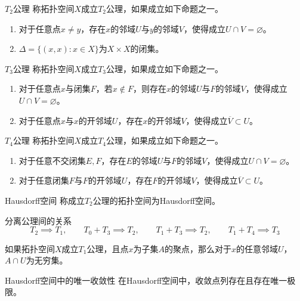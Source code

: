 \documentclass[lang = cn, scheme = chinese, thmcnt = section, usesamecnt]{elegantbook}
\newcommand{\sub}{\subset}             %
\begin{document}
\begin{definition}{$T_2$公理}
	称拓扑空间$X$成立$T_2$公理，如果成立如下命题之一。
	\begin{enumerate}
		\item 对于任意点$x\ne y$，存在$x$的邻域$U$与$y$的邻域$V$，使得成立$U\cap V=\varnothing$。
		\item $\Delta=\{ (x,x):x\in X \}$为$X\times X$的闭集。
	\end{enumerate}
\end{definition}

\begin{definition}{$T_3$公理}
	称拓扑空间$X$成立$T_3$公理，如果成立如下命题之一。
	\begin{enumerate}
		\item 对于任意点$x$与闭集$F$，若$x\notin F$，则存在$x$的邻域$U$与$F$的邻域$V$，使得成立$U\cap V=\varnothing$。
		\item 对于任意点$x$与$x$的开邻域$U$，存在$x$的开邻域$V$，使得成立$\overline{V}\sub U$。
	\end{enumerate}
\end{definition}

\begin{definition}{$T_4$公理}
	称拓扑空间$X$成立$T_4$公理，如果成立如下命题之一。
	\begin{enumerate}
		\item 对于任意不交闭集$E,F$，存在$E$的邻域$U$与$F$的邻域$V$，使得成立$U\cap V=\varnothing$。
		\item 对于任意闭集$F$与$F$的开邻域$U$，存在$F$的开邻域$V$，使得成立$\overline{V}\sub U$。
	\end{enumerate}
\end{definition}

\begin{definition}{Hausdorff空间}
	称成立$T_2$公理的拓扑空间为Hausdorff空间。
\end{definition}

\begin{theorem}{分离公理间的关系}
	$$
	T_2\implies T_1,\qquad
	T_0+T_3\implies T_2,\qquad
	T_1+T_3\implies T_2,\qquad
	T_1+T_4\implies T_3
	$$
\end{theorem}

\begin{proposition}
	如果拓扑空间$X$成立$T_1$公理，且点$x$为子集$A$的聚点，那么对于$x$的任意邻域$U$，$A\cap U$为无穷集。
\end{proposition}

\begin{theorem}{Hausdorff空间中的唯一收敛性}
	在Hausdorff空间中，收敛点列存在且存在唯一极限。
\end{theorem}
\end{document}

